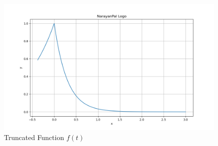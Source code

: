 \documentclass[conference]{IEEEtran}
\theoremstyle{remark}
\begin{document}
	\begin{figure}[H]
		\centering
		\includegraphics[width=1\columnwidth]{figs/window.png} 
		\caption{Truncated Function $f(t)$ }
		\label{fig:Window}
	\end{figure}
	
	
	
	
	
	
\end{document}
